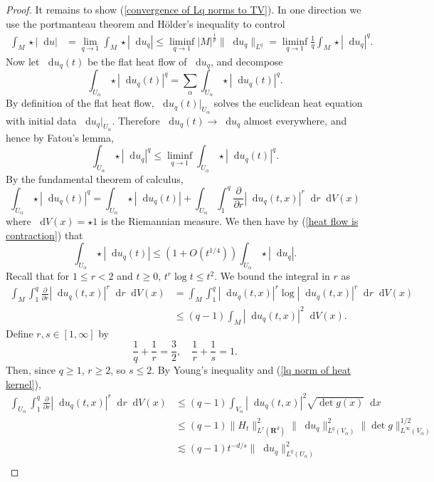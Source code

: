 \documentclass[reqno,11pt]{amsart}
\newcommand{\RR}{\mathbf{R}}
\newcommand*\dif{\mathop{}\!\mathrm{d}}
\theoremstyle{definition}
\numberwithin{equation}{section}
\begin{document}
\begin{proof}
It remains to show (\ref{convergence of Lq norms to TV}).
In one direction we use the portmanteau theorem and H\"older's inequality to control
\begin{align*}
\int_M \star |\dif u|& = \lim_{q \to 1} \int_M \star |\dif u_q| 
\leq \liminf_{q \to 1} |M|^{\frac{1}{p}} \|\dif u_q\|_{L^q} = \liminf_{q \to 1} \frac{1}{q} \int_M \star |\dif u_q|^q.
\end{align*}
Now let $\dif u_q(t)$ be the flat heat flow of $\dif u_q$, and decompose 
$$\int_{U_\alpha} \star |\dif u_q(t)|^q = \sum_\alpha \int_{U_\alpha} \star |\dif u_q(t)|^q.$$
By definition of the flat heat flow, $\dif u_q(t)|_{U_\alpha}$ solves the euclidean heat equation with initial data $\dif u_q|_{U_\alpha}$.
Therefore $\dif u_q(t) \to \dif u_q$ almost everywhere, and hence by Fatou's lemma,
\begin{equation}\label{Fatou}
\int_{U_\alpha} \star |\dif u_q|^q \leq \liminf_{q \to 1} \int_{U_\alpha} \star |\dif u_q(t)|^q.
\end{equation}
By the fundamental theorem of calculus, 
$$\int_{U_\alpha} \star |\dif u_q(t)|^q = \int_{U_\alpha} \star |\dif u_q(t)| + \int_{U_\alpha} \int_1^q \frac{\partial}{\partial r} |\dif u_q(t, x)|^r \dif r \dif V(x)$$
where $\dif V(x) = \star 1$ is the Riemannian measure.
We then have by (\ref{heat flow is contraction}) that
$$\int_{U_\alpha} \star |\dif u_q(t)| \leq (1 + O(t^{1/4})) \int_{U_\alpha} \star |\dif u_q|.$$
Recall that for $1 \leq r < 2$ and $t \geq 0$, $t^r \log t \leq t^2$.
We bound the integral in $r$ as
\begin{align*}
\int_M \int_1^q \frac{\partial}{\partial r} |\dif u_q(t, x)|^r \dif r \dif V(x)
&= \int_M \int_1^q |\dif u_q(t, x)|^r \log |\dif u_q(t, x)|^r \dif r \dif V(x) \\
&\leq (q - 1) \int_M |\dif u_q(t, x)|^2 \dif V(x).
\end{align*}
Define $r, s \in [1, \infty]$ by 
$$\frac{1}{q} + \frac{1}{r} = \frac{3}{2}, \quad \frac{1}{r} + \frac{1}{s} = 1.$$
Then, since $q \geq 1$, $r \geq 2$, so $s \leq 2$.
By Young's inequality and (\ref{lq norm of heat kernel}),
\begin{align*}
\int_{U_\alpha} \int_1^q \frac{\partial}{\partial r} |\dif u_q(t, x)|^r \dif r \dif V(x)
&\leq (q - 1) \int_{V_\alpha} |\dif u_q(t, x)|^2 \sqrt{\det g(x)} \dif x \\
&\leq (q - 1) \|H_t\|_{L^r(\RR^d)}^2 \|\dif u_q\|_{L^q(V_\alpha)}^2 \|\det g\|_{L^\infty(V_\alpha)}^{1/2} \\
&\lesssim (q - 1) t^{-d/s} \|\dif u_q\|_{L^q(U_\alpha)}^2 \\

\end{align*}
\end{proof}
\end{document}
